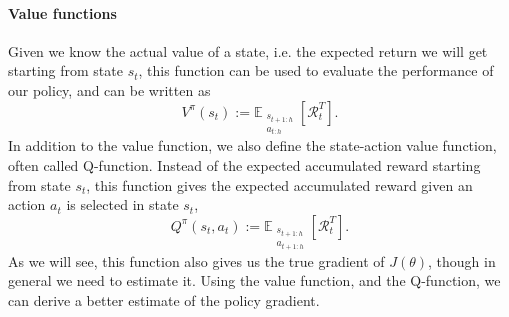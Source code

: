 \documentclass[final]{IEEEtran}
\begin{document}
\paragraph{Value functions} 
Given we know the actual value of a state, i.e. the expected return we will get starting from state $s_t$, this function can be used to evaluate the performance of our policy, and can be written as
\begin{equation}
	V^{\pi}(s_t) := \mathbb{E}_{\substack{s_{t+1:h} \\ a_{t:h}}}\left[\mathcal{R}_t^T\right].
	\label{eqn:v}
\end{equation}
In addition to the value function, we also define the state-action value function, often called Q-function. 
Instead of the expected accumulated reward starting from state $s_t$, this function gives the expected accumulated reward given an action $a_t$ is selected in state $s_t$, 
\begin{equation}
	Q^{\pi}(s_t, a_t) := \mathbb{E}_{\substack{s_{t+1:h} \\ a_{t+1:h}}}\left[\mathcal{R}_t^T\right].
	\label{eqn:q}
\end{equation}
As we will see, this function also gives us the true gradient of $J(\theta)$, though in general we need to estimate it. 
Using the value function, and the Q-function, we can derive a better estimate of the policy gradient.
\end{document}

